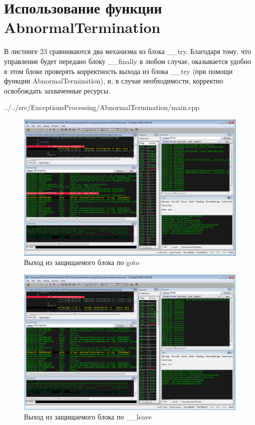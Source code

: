 \documentclass[a4paper, 12pt]{report}		%
\begin{document}
\chapter*{Использование функции AbnormalTermination}

В листинге 23 сравниваются два механизма из блока \_\_try. Благодаря тому, что управление будет передано блоку \_\_finally в любом случае, оказывается удобно в этом блоке проверять корректность выхода из блока \_\_try (при помощи функции AbnormalTermination), и, в случае необходимости, корректно освобождать захваченные ресурсы\cite{Dushutina}.


{../../src/ExceptionsProcessing/AbnormalTermination/main.cpp}

\begin{figure}[h!]
\centering
\includegraphics[scale=0.50]{res/014}
\caption{Выход из защищаемого блока по goto}
\end{figure}

\begin{figure}[h!]
\centering
\includegraphics[scale=0.50]{res/015}
\caption{Выход из защищаемого блока по \_\_leave}
\end{figure}
\end{document}
